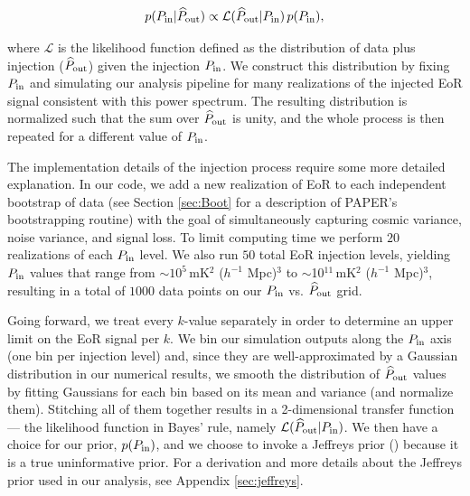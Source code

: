 \documentclass[preprint2,numberedappendix,tighten]{aastex6}  %
\begin{document}
\begin{equation}
\label{eq:Bayes}
p(P_{\rm in} | \widehat{P}_{\rm out}) \propto {\mathcal{L} (  \widehat{P}_{\rm out} | P_{\rm in})}\,p(P_{\rm in}) ,
\end{equation}

\noindent where $\mathcal{L} $ is the likelihood function defined 
as the distribution of data plus injection ($\widehat{P}_{\rm out}$) given the injection $P_{\rm in}$.  We construct this distribution  
by fixing $P_{\rm in}$ and simulating our analysis pipeline for many realizations of the injected EoR signal 
consistent with this power spectrum. The resulting distribution is normalized such that the sum over $\widehat{P}_{\rm out}$ is unity, and the 
whole process is then repeated for a different value of $P_{\rm in}$. 


The implementation details of the injection process require some more detailed explanation. In our code, we add a new realization of EoR to each independent bootstrap of data (see Section \ref{sec:Boot} for a description of PAPER's bootstrapping routine) with the goal of simultaneously capturing cosmic variance, noise variance, and signal loss. To limit computing time we perform $20$ realizations of each $P_{\rm in}$ level. We also run $50$ total EoR injection levels, yielding $P_{\rm in}$ values that range from $\sim$$10^{5}$\,mK$^{2}$ ($h^{-1}$ Mpc)$^{3}$ to $\sim$10$^{11}$\,mK$^{2}$ ($h^{-1}$ Mpc)$^{3}$, resulting in a total of $1000$ data points on our $P_{\rm in}$ vs. $\widehat{P}_{\rm out}$ grid. 

Going forward, we treat every $k$-value separately in order to determine an upper limit on the EoR signal per $k$. We bin our simulation outputs along the $P_{\rm in}$ axis (one bin per injection level) and, since they are well-approximated by a Gaussian distribution in our numerical results, we smooth the distribution of $\widehat{P}_{\rm out}$ values by fitting Gaussians for each bin based on its mean and variance (and normalize them). Stitching all of them together results in a 2-dimensional transfer function --- the likelihood function in Bayes' rule, namely $\mathcal{L} (  \widehat{P}_{\rm out} | P_{\rm in})$. We then have a choice for our prior, $p(P_{\rm in})$, and we choose to invoke a Jeffreys prior (\citealt{jaynes1968}) because it is a true uninformative prior. For a derivation and more details about the Jeffreys prior used in our analysis, see Appendix \ref{sec:jeffreys}.
\end{document}
